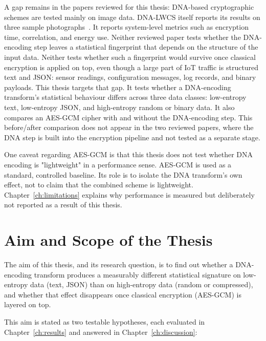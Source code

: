 \documentclass[12pt,a4paper,twoside]{report}
\numberwithin{equation}{chapter}
\begin{document}
A gap remains in the papers reviewed for this thesis: DNA-based cryptographic schemes are tested mainly on image data.
DNA-LWCS itself reports its results on three sample
photographs~\cite{aqeel2025}. It reports system-level metrics such as
encryption time, correlation, and energy use. Neither reviewed paper
tests whether the DNA-encoding step leaves a statistical fingerprint
that depends on the structure of the input data. Neither tests whether
such a fingerprint would survive once classical encryption is applied
on top, even though a large part of IoT traffic is structured text
and JSON: sensor readings, configuration messages, log records, and
binary payloads. This thesis targets that gap. It tests whether a
DNA-encoding transform's statistical behaviour differs across three data
classes: low-entropy text, low-entropy JSON, and high-entropy random or
binary data. It also compares an AES-GCM cipher with and without the
DNA-encoding step. This before/after comparison does not appear in the
two reviewed papers, where the DNA step is built into the encryption
pipeline and not tested as a separate stage.

One caveat regarding AES-GCM is that this thesis does not test whether DNA
encoding is "lightweight" in a performance sense. AES-GCM is used as a
standard, controlled baseline. Its role is to isolate the DNA
transform's own effect, not to claim that the combined scheme is
lightweight. Chapter~\ref{ch:limitations} explains why performance is
measured but deliberately not reported as a result of this thesis.

\chapter{Aim and Scope of the Thesis}
\label{ch:aim}


The aim of this thesis, and its research question, is to find out
whether a DNA-encoding transform produces a measurably different
statistical signature on low-entropy data (text, JSON) than on
high-entropy data (random or compressed), and whether that effect
disappears once classical encryption (AES-GCM) is layered on top.

This aim is stated as two testable hypotheses, each evaluated in
Chapter~\ref{ch:results} and answered in Chapter~\ref{ch:discussion}:
\end{document}
